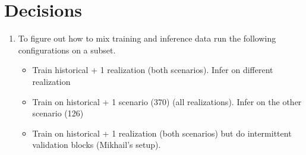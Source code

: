 \section*{Decisions}
\begin{enumerate}
    \item To figure out how to mix training and inference data run the following configurations on a subset. 
    \begin{itemize}
        \item Train historical + 1 realization (both scenarios). Infer on different realization
        \item Train on historical + 1 scenario (370) (all realizations). Infer on the other scenario (126)
        \item Train on historical + 1 realization (both scenarios) but do intermittent validation blocks (Mikhail's setup).
    \end{itemize}
\end{enumerate}
